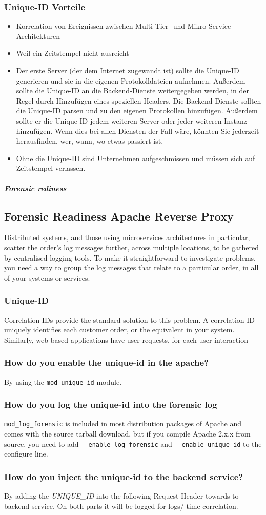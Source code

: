 \subsubsection{Unique-ID Vorteile}
\begin{itemize}
    \item Korrelation von Ereignissen zwischen Multi-Tier- und Mikro-Service-Architekturen
    \item Weil ein Zeitstempel nicht ausreicht
    \item Der erste Server (der dem Internet zugewandt ist) sollte die Unique-ID generieren und sie in die eigenen Protokolldateien aufnehmen. Außerdem sollte die Unique-ID an die Backend-Dienste weitergegeben werden, in der Regel durch Hinzufügen eines speziellen Headers. Die Backend-Dienste sollten die Unique-ID parsen und zu den eigenen Protokollen hinzufügen. Außerdem sollte er die Unique-ID jedem weiteren Server oder jeder weiteren Instanz hinzufügen. Wenn dies bei allen Diensten der Fall wäre, könnten Sie jederzeit herausfinden, wer, wann, wo etwas passiert ist.
    \item Ohne die Unique-ID sind Unternehmen aufgeschmissen und müssen sich auf Zeitstempel verlassen.
\end{itemize}
\subparagraph{Forensic rediness}
\subsection{Forensic Readiness Apache Reverse Proxy}
Distributed systems, and those using microservices architectures in particular, scatter the order's log messages further, across multiple locations, to be gathered by centralised logging tools. To make it straightforward to investigate problems, you need a way to group the log messages that relate to a particular order, in all of your systems or services.
\subsubsection{Unique-ID}
Correlation IDs provide the standard solution to this problem. A correlation ID uniquely identifies each \glqq customer order\grqq, or the equivalent in your system. Similarly, web-based applications have \glqq user requests\grqq, for each user interaction
\subsubsection{How do you enable the unique-id in the apache?}
By using the \lstinline|mod_unique_id| module.
\subsubsection{How do you log the unique-id into the forensic log}
\lstinline|mod_log_forensic| is included in most distribution packages of Apache and comes with the source tarball download, but if you compile Apache 2.x.x from source, you need to add \lstinline|--enable-log-forensic| and \lstinline|--enable-unique-id| to the configure line.
\subsubsection{How do you inject the unique-id to the backend service?}
By adding the \textit{UNIQUE\_ID} into the following Request Header towards to backend service. On both parts it will be logged for logs/ time correlation.